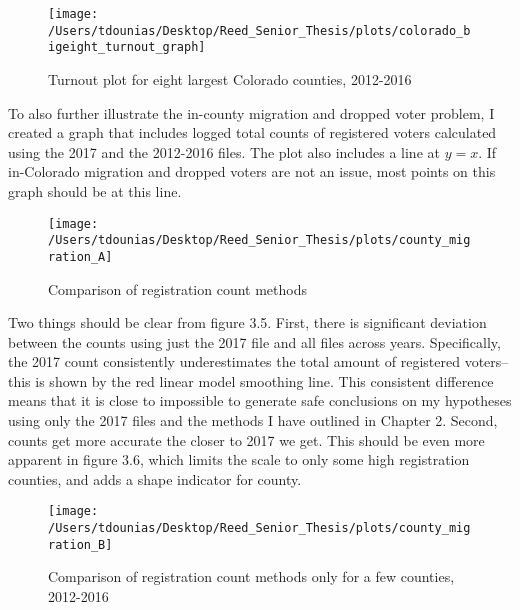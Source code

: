 \documentclass[12pt,twoside]{reedthesis}
\begin{document}
  \begin{figure}
  
  {\centering \texttt{[image: /Users/tdounias/Desktop/Reed\_Senior\_Thesis/plots/colorado\_bigeight\_turnout\_graph]} 
  
  }
  
  \caption[Turnout plot for eight largest Colorado counties, 2012-2016]{Turnout plot for eight largest Colorado counties, 2012-2016}\label{fig:big eight turnout plot}
  \end{figure}
  
  To also further illustrate the in-county migration and dropped voter
  problem, I created a graph that includes logged total counts of
  registered voters calculated using the 2017 and the 2012-2016 files. The
  plot also includes a line at \(y = x\). If in-Colorado migration and
  dropped voters are not an issue, most points on this graph should be at
  this line.
  
  \begin{figure}
  
  {\centering \texttt{[image: /Users/tdounias/Desktop/Reed\_Senior\_Thesis/plots/county\_migration\_A]} 
  
  }
  
  \caption[Comparison of registration count methods]{Comparison of registration count methods}\label{fig:county migration A}
  \end{figure}
  
  Two things should be clear from figure 3.5. First, there is significant
  deviation between the counts using just the 2017 file and all files
  across years. Specifically, the 2017 count consistently underestimates
  the total amount of registered voters--this is shown by the red linear
  model smoothing line. This consistent difference means that it is close
  to impossible to generate safe conclusions on my hypotheses using only
  the 2017 files and the methods I have outlined in Chapter 2. Second,
  counts get more accurate the closer to 2017 we get. This should be even
  more apparent in figure 3.6, which limits the scale to only some high
  registration counties, and adds a shape indicator for county.
  
  \begin{figure}
  
  {\centering \texttt{[image: /Users/tdounias/Desktop/Reed\_Senior\_Thesis/plots/county\_migration\_B]} 
  
  }
  
  \caption[Comparison of registration count methods only for a few counties, 2012-2016]{Comparison of registration count methods only for a few counties, 2012-2016}\label{fig:county migration B}
  \end{figure}
  
\end{document}
